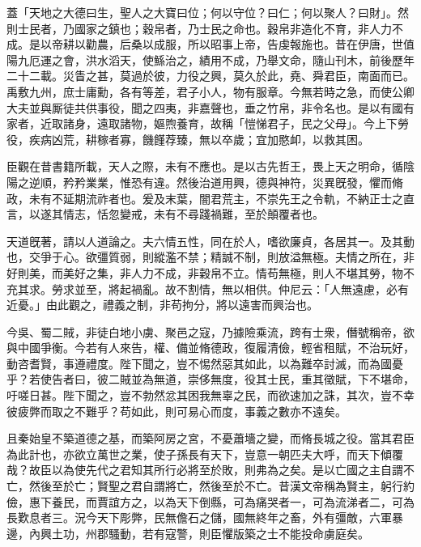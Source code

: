 \begin{pinyinscope}
 
 
 
 蓋「天地之大德曰生，聖人之大寶曰位；何以守位？曰仁；何以聚人？曰財」。然則士民者，乃國家之鎮也；穀帛者，乃士民之命也。穀帛非造化不育，非人力不成。是以帝耕以勸農，后桑以成服，所以昭事上帝，告虔報施也。昔在伊唐，世值陽九厄運之會，洪水滔天，使鯀治之，績用不成，乃舉文命，隨山刊木，前後歷年二十二載。災眚之甚，莫過於彼，力役之興，莫久於此，堯、舜君臣，南面而已。禹敷九州，庶士庸勳，各有等差，君子小人，物有服章。今無若時之急，而使公卿大夫並與厮徒共供事役，聞之四夷，非嘉聲也，垂之竹帛，非令名也。是以有國有家者，近取諸身，遠取諸物，嫗煦養育，故稱「愷悌君子，民之父母」。今上下勞役，疾病凶荒，耕稼者寡，饑饉荐臻，無以卒歲；宜加愍卹，以救其困。
 
 
 
 
 臣觀在昔書籍所載，天人之際，未有不應也。是以古先哲王，畏上天之明命，循陰陽之逆順，矜矜業業，惟恐有違。然後治道用興，德與神符，災異旣發，懼而脩政，未有不延期流祚者也。爰及末葉，闇君荒主，不崇先王之令軌，不納正士之直言，以遂其情志，恬忽變戒，未有不尋踐禍難，至於顛覆者也。
 
 
 
 
 天道旣著，請以人道論之。夫六情五性，同在於人，嗜欲廉貞，各居其一。及其動也，交爭于心。欲彊質弱，則縱濫不禁；精誠不制，則放溢無極。夫情之所在，非好則美，而美好之集，非人力不成，非穀帛不立。情苟無極，則人不堪其勞，物不充其求。勞求並至，將起禍亂。故不割情，無以相供。仲尼云：「人無遠慮，必有近憂。」由此觀之，禮義之制，非苟拘分，將以遠害而興治也。
 
 
 
 
 今吳、蜀二賊，非徒白地小虜、聚邑之寇，乃據險乘流，跨有士衆，僭號稱帝，欲與中國爭衡。今若有人來告，權、備並脩德政，復履清儉，輕省租賦，不治玩好，動咨耆賢，事遵禮度。陛下聞之，豈不惕然惡其如此，以為難卒討滅，而為國憂乎？若使告者曰，彼二賊並為無道，崇侈無度，役其士民，重其徵賦，下不堪命，吁嗟日甚。陛下聞之，豈不勃然忿其困我無辜之民，而欲速加之誅，其次，豈不幸彼疲弊而取之不難乎？苟如此，則可易心而度，事義之數亦不遠矣。
 
 
 
 
 且秦始皇不築道德之基，而築阿房之宮，不憂蕭墻之變，而脩長城之役。當其君臣為此計也，亦欲立萬世之業，使子孫長有天下，豈意一朝匹夫大呼，而天下傾覆哉？故臣以為使先代之君知其所行必將至於敗，則弗為之矣。是以亡國之主自謂不亡，然後至於亡；賢聖之君自謂將亡，然後至於不亡。昔漢文帝稱為賢主，躬行約儉，惠下養民，而賈誼方之，以為天下倒縣，可為痛哭者一，可為流涕者二，可為長歎息者三。況今天下彫弊，民無儋石之儲，國無終年之畜，外有彊敵，六軍暴邊，內興土功，州郡騷動，若有寇警，則臣懼版築之士不能投命虜庭矣。
 

\end{pinyinscope}

